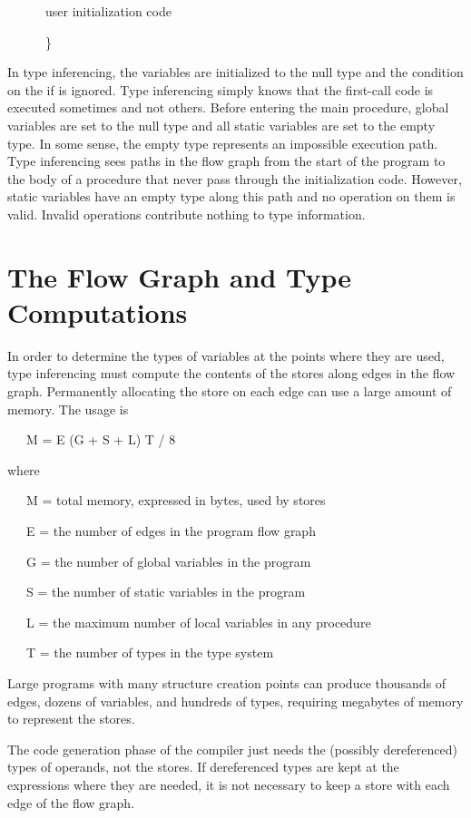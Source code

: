 {\ttfamily\mdseries
\ \ \ \ \ \ user initialization code}

{\ttfamily\mdseries
\ \ \ \ \ \ \}}

In type inferencing, the variables are initialized to the null type
and the condition on the if is ignored. Type inferencing simply knows
that the first-call code is executed sometimes and not others. Before
entering the main procedure, global variables are set to the null type
and all static variables are set to the empty type. In some sense, the
empty type represents an impossible execution path. Type inferencing
sees paths in the flow graph from the start of the program to the body
of a procedure that never pass through the initialization
code. However, static variables have an empty type along this path and
no operation on them is valid. Invalid operations contribute nothing
to type information.


\section{The Flow Graph and Type Computations}

In order to determine the types of variables at the points where they
are used, type inferencing must compute the contents of the stores
along edges in the flow graph. Permanently allocating the store on
each edge can use a large amount of memory. The usage is

{\ttfamily\mdseries
\ \ \ M = E (G + S + L) T / 8}

\noindent where 

{\ttfamily\mdseries
\ \ \ M = total memory, expressed in bytes, used by stores}

{\ttfamily\mdseries
\ \ \ E = the number of edges in the program flow graph}

{\ttfamily\mdseries
\ \ \ G = the number of global variables in the program}

{\ttfamily\mdseries
\ \ \ S = the number of static variables in the program}

{\ttfamily\mdseries
\ \ \ L = the maximum number of local variables in any procedure}

{\ttfamily\mdseries
\ \ \ T = the number of types in the type system}

Large programs with many structure creation points can produce
thousands of edges, dozens of variables, and hundreds of types,
requiring megabytes of memory to represent the stores.

The code generation phase of the compiler just needs the (possibly
dereferenced) types of operands, not the stores. If dereferenced types
are kept at the expressions where they are needed, it is not necessary
to keep a store with each edge of the flow graph.

